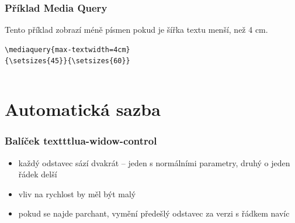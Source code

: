 \begin{frame}[fragile]

  \frametitle{Příklad Media Query}

  Tento příklad zobrazí méně písmen pokud je šířka textu menší, než 4 cm.

  
\begin{verbatim}
\mediaquery{max-textwidth=4cm}
{\setsizes{45}}{\setsizes{60}}
\end{verbatim}
\begin{columns}
  \begin{column}{0.5\textwidth}
\end{column}
  \begin{column}{0.5\textwidth}
\end{column}
\end{columns}

\end{frame}


\section{Automatická sazba}

\begin{frame}
  \frametitle{Balíček texttt{lua-widow-control}}
  \begin{itemize}
    \item každý odstavec sází dvakrát -- jeden s normálními parametry, druhý o jeden řádek delší
    \item vliv na rychlost by měl být malý
    
    \item pokud se najde parchant, vymění předešlý odstavec za verzi s řádkem navíc
  \end{itemize}
\end{frame}

